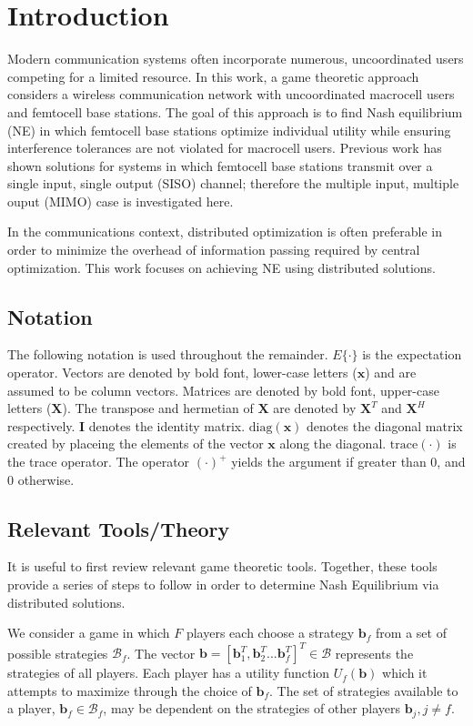 
\chapter{Introduction}
Modern communication systems often incorporate numerous, uncoordinated users competing for a limited resource. In this work, a game theoretic approach considers a wireless communication network with uncoordinated macrocell users and femtocell base stations. The goal of this approach is to find Nash equilibrium (NE) in which femtocell base stations optimize individual utility while ensuring interference tolerances are not violated for macrocell users. 
Previous work has shown solutions for systems in which femtocell base stations transmit over a single input, single output (SISO) channel; therefore the multiple input, multiple ouput (MIMO) case is investigated here. 
\par
In the communications context, distributed optimization is often preferable in order to minimize the overhead of information passing required by central optimization. 
This work focuses on achieving NE using distributed solutions. 


\section{Notation}
The following notation is used throughout the remainder. 
$E\{\cdot\}$ is the expectation operator.
Vectors are denoted by bold font, lower-case letters ($\mathbf{x}$) and are assumed to be column vectors.
Matrices are denoted by bold font, upper-case letters ($\mathbf{X}$). The transpose and hermetian of $\mathbf{X}$ are denoted by $\mathbf{X}^T$ and $\mathbf{X}^H$ respectively.
$\mathbf{I}$ denotes the identity matrix. $\mathrm{diag}(\mathbf{x})$ denotes the diagonal matrix created by placeing the elements of the vector $\mathbf{x}$ along the diagonal. $\mathrm{trace}(\cdot)$ is the trace operator. The operator $(\cdot)^+$ yields the argument if greater than 0, and 0 otherwise.


\section{Relevant Tools/Theory}\label{tools}
It is useful to first review relevant game theoretic tools. Together, these tools provide a series of steps to follow in order to determine Nash Equilibrium via distributed solutions. 
\par
We consider a game in which $F$ players each choose a strategy $\mathbf{b}_{f}$ from a set of possible strategies $\mathcal{B}_f$. The vector $\mathbf{b}=[\mathbf{b}_{1}^T, \mathbf{b}_2^T... \mathbf{b}_{f}^T]^T \in \mathcal{B}$ represents the strategies of all players. Each player has a utility function $U_f(\mathbf{b})$ which it attempts to maximize through the choice of $\mathbf{b}_{f}$. The set of strategies available to a player, $\mathbf{b}_{f} \in\mathcal{B}_f$, may be dependent on the strategies of other players $\mathbf{b}_{j}, j \neq f $.

